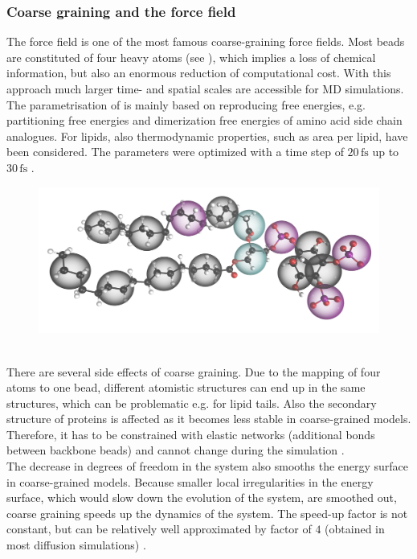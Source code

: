 \subsubsection{Coarse graining and the \martini{} force field}
\label{subsub:coarsegraining}
The \martini{} force field \autocites{martini}{martini22}{martini22_lipids} is one of the most famous coarse-graining force fields. Most beads are constituted of four heavy atoms (see ), which implies a loss of chemical information, but also an enormous reduction of computational cost. With this approach much larger time- and spatial scales are accessible for MD simulations.\\
The parametrisation of \martini{} is mainly based on reproducing free energies, e.g. partitioning free energies and dimerization free energies of amino acid side chain analogues. For lipids, also thermodynamic properties, such as area per lipid, have been considered. The parameters were optimized with a time step of $20\,\si{\femto\second}$ up to $30\,\si{\femto\second}$ \autocites{martini22}{martini22_lipids}.\\
%
%
%
\begin{figure}[b]
	\centering
	\includegraphics[width=.5\textwidth]{figures/introduction/fig_martini_mapping}
	\label{md:martinimapping}
\end{figure}
%
%
%
\\
There are several side effects of coarse graining. Due to the mapping of four atoms to one bead, different atomistic structures can end up in the same \martini{} structures, which can be problematic e.g. for lipid tails. Also the secondary structure of proteins is affected as it becomes less stable in coarse-grained models. Therefore, it has to be constrained with elastic networks (additional bonds between backbone beads) and cannot change during the simulation \autocite{martini22_check}.\\
The decrease in degrees of freedom in the system also smooths the energy surface in coarse-grained models. Because smaller local irregularities in the energy surface, which would slow down the evolution of the system, are smoothed out, coarse graining speeds up the dynamics of the system. The speed-up factor is not constant, but can be relatively well approximated by factor of $4$ (obtained in most diffusion simulations) \autocites{martini22_check}{martini}.\\
